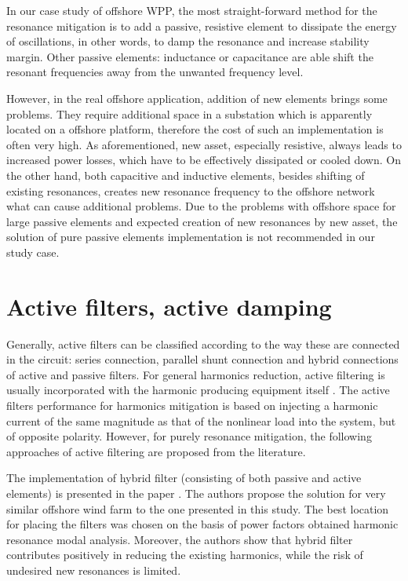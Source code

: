 \documentclass[a4paper,11pt,twoside,openright]{report}
\begin{document}
In our case study of offshore WPP, the most straight-forward method for the resonance mitigation is to add a passive, resistive element to dissipate the energy of oscillations, in other words, to damp the resonance and increase stability margin. Other passive elements: inductance or capacitance are able shift the resonant frequencies away from the unwanted frequency level.

However, in the real offshore application, addition of new elements brings some problems. They require additional space in a substation which is apparently located on a offshore platform, therefore the cost of such an implementation is often very high. As aforementioned, new asset, especially resistive, always leads to increased power losses, which have to be effectively dissipated or cooled down. On the other hand, both capacitive and inductive elements, besides shifting of existing resonances, creates new resonance frequency to the offshore network what can cause additional problems. Due to the problems with offshore space for large passive elements and expected creation of new resonances by new asset, the solution of pure passive elements implementation is not recommended in our study case.

\section{Active filters, active damping}
Generally, active filters can be classified according to the way these are connected in the circuit: series connection, parallel shunt connection and hybrid connections of active and passive filters. For general harmonics reduction, active filtering is usually incorporated with the harmonic producing equipment itself \cite{das}. The active filters performance for harmonics mitigation is based on injecting a harmonic current of the same magnitude as that of the nonlinear load into the system, but of opposite polarity. However, for purely resonance mitigation, the following approaches of active filtering are proposed from the literature.

The implementation of hybrid filter (consisting of both passive and active elements) is presented in the paper \cite{hasan2014}. The authors propose the solution for very similar offshore wind farm to the one presented in this study. The best location for placing the filters was chosen on the basis of power factors obtained harmonic resonance modal analysis. Moreover, the authors show that hybrid filter contributes positively in reducing the existing harmonics, while the risk of undesired new resonances is limited.
\end{document}
